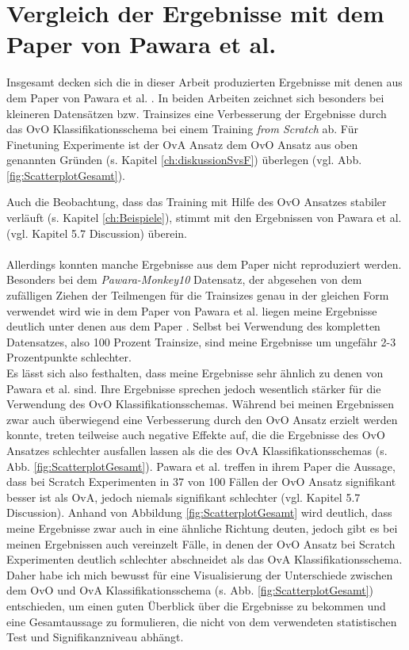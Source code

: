 \newpage

\section{Vergleich der Ergebnisse mit dem Paper von Pawara et al. \cite{pawaraPaper}}
Insgesamt decken sich die in dieser Arbeit produzierten Ergebnisse mit denen aus dem Paper von Pawara et al. \cite{pawaraPaper}. In beiden Arbeiten zeichnet sich besonders bei kleineren Datensätzen bzw. Trainsizes eine Verbesserung der Ergebnisse durch das OvO Klassifikationsschema bei einem Training \textit{from Scratch} ab. Für Finetuning Experimente ist der OvA Ansatz dem OvO Ansatz aus oben genannten Gründen (s. Kapitel \ref{ch:diskussionSvsF}) überlegen (vgl. Abb. \ref{fig:ScatterplotGesamt}).

Auch die Beobachtung, dass das Training mit Hilfe des OvO Ansatzes stabiler verläuft (s. Kapitel \ref{ch:Beispiele}), stimmt mit den Ergebnissen von Pawara et al. (vgl. \cite{pawaraPaper} Kapitel 5.7 Discussion) überein.\\\\

Allerdings konnten manche Ergebnisse aus dem Paper \cite{pawaraPaper} nicht reproduziert werden. Besonders bei dem \textit{Pawara-Monkey10} Datensatz, der abgesehen von dem zufälligen Ziehen der Teilmengen für die Trainsizes genau in der gleichen Form verwendet wird wie in dem Paper von Pawara et al. \cite{pawaraPaper} liegen meine Ergebnisse deutlich unter denen aus dem Paper \cite{pawaraPaper}. Selbst bei Verwendung des kompletten Datensatzes, also 100 Prozent Trainsize, sind meine Ergebnisse um ungefähr 2-3 Prozentpunkte schlechter.\\

Es lässt sich also festhalten, dass meine Ergebnisse sehr ähnlich zu denen von Pawara et al. \cite{pawaraPaper} sind. Ihre Ergebnisse sprechen jedoch wesentlich stärker für die Verwendung des OvO Klassifikationsschemas. Während bei meinen Ergebnissen zwar auch überwiegend eine Verbesserung durch den OvO Ansatz erzielt werden konnte, treten teilweise auch negative Effekte auf, die die Ergebnisse des OvO Ansatzes schlechter ausfallen lassen als die des OvA Klassifikationsschemas (s. Abb. \ref{fig:ScatterplotGesamt}). Pawara et al. \cite{pawaraPaper} treffen in ihrem Paper die Aussage, dass bei Scratch Experimenten in 37 von 100 Fällen der OvO Ansatz signifikant besser ist als OvA, jedoch niemals signifikant schlechter (vgl. \cite{pawaraPaper} Kapitel 5.7 Discussion).
Anhand von Abbildung \ref{fig:ScatterplotGesamt} wird deutlich, dass meine Ergebnisse zwar auch in eine ähnliche Richtung deuten, jedoch gibt es bei meinen Ergebnissen auch vereinzelt Fälle, in denen der OvO Ansatz bei Scratch Experimenten deutlich schlechter abschneidet als das OvA Klassifikationsschema.\\
Daher habe ich mich bewusst für eine Visualisierung der Unterschiede zwischen dem OvO und OvA Klassifikationsschema (s. Abb. \ref{fig:ScatterplotGesamt}) entschieden, um einen guten Überblick über die Ergebnisse zu bekommen und eine Gesamtaussage zu formulieren, die nicht von dem verwendeten statistischen Test und Signifikanzniveau abhängt.